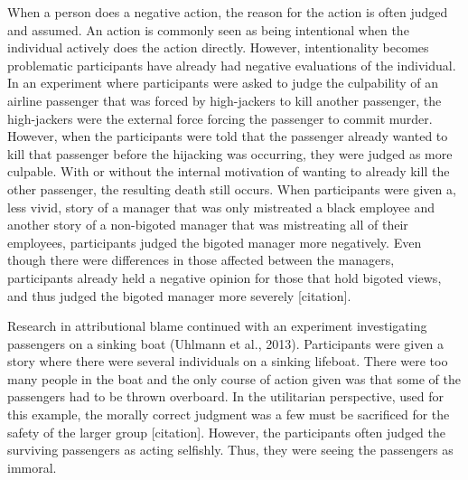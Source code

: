 \documentclass[
  english,
  donotrepeattitle,doc, 12pt, a4paper,floatsintext]{apa7}
\begin{document}
When a person does a negative action, the reason for the action is often judged and assumed. An action is commonly seen as being intentional when the individual actively does the action directly. However, intentionality becomes problematic participants have already had negative evaluations of the individual. In an experiment where participants were asked to judge the culpability of an airline passenger that was forced by high-jackers to kill another passenger, the high-jackers were the external force forcing the passenger to commit murder. However, when the participants were told that the passenger already wanted to kill that passenger before the hijacking was occurring, they were judged as more culpable. With or without the internal motivation of wanting to already kill the other passenger, the resulting death still occurs. When participants were given a, less vivid, story of a manager that was only mistreated a black employee and another story of a non-bigoted manager that was mistreating all of their employees, participants judged the bigoted manager more negatively. Even though there were differences in those affected between the managers, participants already held a negative opinion for those that hold bigoted views, and thus judged the bigoted manager more severely {[}citation{]}.

Research in attributional blame continued with an experiment investigating passengers on a sinking boat (Uhlmann et al., 2013). Participants were given a story where there were several individuals on a sinking lifeboat. There were too many people in the boat and the only course of action given was that some of the passengers had to be thrown overboard. In the utilitarian perspective, used for this example, the morally correct judgment was a few must be sacrificed for the safety of the larger group {[}citation{]}. However, the participants often judged the surviving passengers as acting selfishly. Thus, they were seeing the passengers as immoral.
\end{document}
